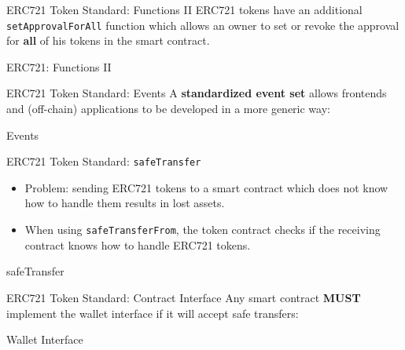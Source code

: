 \documentclass[handout]{beamer}
\begin{document}
\begin{frame}{ERC721 Token Standard: Functions II}
ERC721 tokens have an additional \texttt{setApprovalForAll} function which allows an owner to set or revoke the approval for \textbf{all} of his tokens in the smart contract. 
\vspace{1em}
	\begin{samplecode}{ERC721: Functions II}
		
	\end{samplecode}
\end{frame}

\begin{frame}{ERC721 Token Standard: Events}
\vspace{0.5em}
	A \textbf{standardized event set} allows frontends and (off-chain) applications to be developed in a more generic way:
\vspace{1em}
	\begin{samplecode}{Events}
		
	\end{samplecode}
\end{frame}

\begin{frame}{ERC721 Token Standard: \texttt{safeTransfer}}
\begin{itemize}
	\item Problem: sending ERC721 tokens to a smart contract which does not know how to handle them results in lost assets.
	\item When using \texttt{safeTransferFrom}, the token contract checks if the receiving contract knows how to handle ERC721 tokens. 
\end{itemize}
\vspace{1em}
	\begin{samplecode}{safeTransfer}
		
	\end{samplecode}
\end{frame}


\begin{frame}{ERC721 Token Standard: Contract Interface}
\vspace{0.5em}
	Any smart contract \textbf{MUST} implement the wallet interface if it will accept safe transfers:
\vspace{1em}
	\begin{samplecode}{Wallet Interface}
		
	\end{samplecode}
\end{frame}
\end{document}
